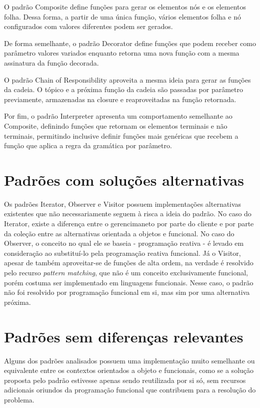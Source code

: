 O padrão Composite define funções para gerar os 
elementos nós e os elementos folha. Dessa forma, 
a partir de uma única função, vários elementos 
folha e nó configurados com valores diferentes 
podem ser gerados.

De forma semelhante, o padrão Decorator define 
funções que podem receber como parâmetro valores 
variados enquanto retorna uma nova função com 
a mesma assinatura da função decorada. 

O padrão Chain of Responsibility aproveita a mesma 
ideia para gerar as funções da cadeia. O tópico e 
a próxima função da cadeia são passadas por parâmetro 
previamente, armazenadas na closure e reaproveitadas 
na função retornada. 

Por fim, o padrão Interpreter apresenta um comportamento 
semelhante ao Composite, definindo funções que retornam 
os elementos terminais e não terminais, permitindo 
inclusive definir funções mais genéricas que recebem 
a função que aplica a regra da gramática por parâmetro.

\section{Padrões com soluções alternativas}

Os padrões Iterator, Observer e Visitor possuem 
implementações alternativas existentes que não 
necessariamente 
seguem à risca a ideia do padrão. No caso do Iterator, 
existe a diferença entre o gerencimaneto por parte 
do cliente e por parte da coleção entre as 
alternativas orientada a objetos e funcional. No 
caso do Observer, o conceito no qual ele se 
baseia - programação reativa - é levado em 
consideração ao substituí-lo pela programação 
reativa funcional. Já o Visitor, apesar de também 
aproveitar-se de funções de alta ordem, na verdade 
é resolvido pelo recurso \textit{pattern matching}, 
que não é um conceito exclusivamente funcional, 
porém costuma ser implementado em linguagens 
funcionais. Nesse caso, o padrão não foi 
resolvido por programação funcional em si, 
mas sim por uma alternativa próxima. 

\section{Padrões sem diferenças relevantes}

Alguns dos padrões analisados possuem 
uma implementação muito semelhante ou 
equivalente entre os contextos orientados 
a objeto e funcionais, como se a solução 
proposta pelo padrão estivesse apenas 
sendo reutilizada por si só, sem 
recursos adicionais oriundos da programação 
funcional que contribuem para a 
resolução do problema. 

